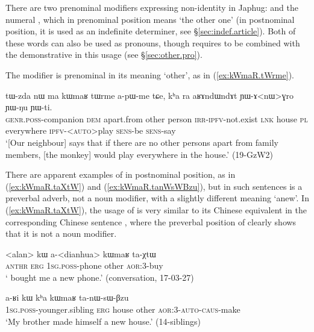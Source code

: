 There are two prenominal modifiers expressing non-identity in Japhug:  and the numeral , which in prenominal position means `the other one' (in postnominal position, it is used as an indefinite determiner, see §\ref{sec:indef.article}). Both of these words can also be used as pronouns, though  requires to be combined with the demonstrative  in this usage (see §\ref{sec:other.pro}).

The modifier  is prenominal in its meaning `other', as in (\ref{ex:kWmaR.tWrme}). 

\begin{exe}
\ex \label{ex:kWmaR.tWrme}
\gll tɯ-zda nɯ ma kɯmaʁ tɯrme a-pɯ-me tɕe, kʰa ra aʁɤndɯndɤt ɲɯ-ɤ<nɯ>ɣro ɲɯ-ŋu ɲɯ-ti. \\
\textsc{genr}.\textsc{poss}-companion \textsc{dem} apart.from other person \textsc{irr}-\textsc{ipfv}-not.exist \textsc{lnk} house \textsc{pl} everywhere \textsc{ipfv}-<\textsc{auto}>play \textsc{sens}-be \textsc{sens}-say \\
\glt `[Our neighbour] says that if there are no other persons apart from family members, [the monkey] would play everywhere in the house.' (19-GzW2)
\end{exe}

There are apparent examples of  in postnominal position, as in (\ref{ex:kWmaR.taXtW}) and (\ref{ex:kWmaR.tanWsWBzu}), but in such sentences  is a preverbal adverb, not a noun modifier, with a slightly different meaning `anew'. In (\ref{ex:kWmaR.taXtW}), the usage of  is very similar to its Chinese equivalent  in the corresponding Chinese sentence , where the preverbal position of  clearly shows that it is not a noun modifier. 

\begin{exe}
\ex \label{ex:kWmaR.taXtW}
\gll <alan> kɯ a-<dianhua> kɯmaʁ ta-χtɯ \\
\textsc{anthr} \textsc{erg} \textsc{1sg}.\textsc{poss}-phone other \textsc{aor}:3\flobv{}-buy \\
\glt ` bought me a new phone.' (conversation, 17-03-27)
\end{exe}

\begin{exe}
\ex \label{ex:kWmaR.tanWsWBzu}
\gll a-ʁi kɯ kʰa kɯmaʁ ta-nɯ-sɯ-βzu\\
\textsc{1sg}.\textsc{poss}-younger.sibling \textsc{erg} house other \textsc{aor}:3\flobv{}-\textsc{auto}-\textsc{caus}-make\\
\glt `My brother made himself a new house.' (14-siblings)
\end{exe}

